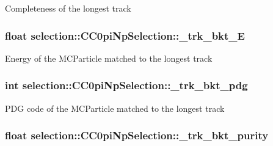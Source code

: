 Completeness of the longest track \hypertarget{classselection_1_1CC0piNpSelection_aa7a6076f1169185e0b2b02fbb03aba22}{
\subsubsection[{\-\_\-trk\-\_\-bkt\-\_\-\-E}]{\setlength{\rightskip}{0pt plus 5cm}float selection\-::\-C\-C0pi\-Np\-Selection\-::\-\_\-trk\-\_\-bkt\-\_\-\-E\hspace{0.3cm}{\ttfamily [private]}}}\label{classselection_1_1CC0piNpSelection_aa7a6076f1169185e0b2b02fbb03aba22}
Energy of the M\-C\-Particle matched to the longest track \hypertarget{classselection_1_1CC0piNpSelection_a7044de37ee4f3615ffe4bb15e9f00f8e}{
\subsubsection[{\-\_\-trk\-\_\-bkt\-\_\-pdg}]{\setlength{\rightskip}{0pt plus 5cm}int selection\-::\-C\-C0pi\-Np\-Selection\-::\-\_\-trk\-\_\-bkt\-\_\-pdg\hspace{0.3cm}{\ttfamily [private]}}}\label{classselection_1_1CC0piNpSelection_a7044de37ee4f3615ffe4bb15e9f00f8e}
P\-D\-G code of the M\-C\-Particle matched to the longest track \hypertarget{classselection_1_1CC0piNpSelection_a39a84b873306f200a2350b4804429791}{
\subsubsection[{\-\_\-trk\-\_\-bkt\-\_\-purity}]{\setlength{\rightskip}{0pt plus 5cm}float selection\-::\-C\-C0pi\-Np\-Selection\-::\-\_\-trk\-\_\-bkt\-\_\-purity\hspace{0.3cm}{\ttfamily [private]}}}\label{classselection_1_1CC0piNpSelection_a39a84b873306f200a2350b4804429791}
